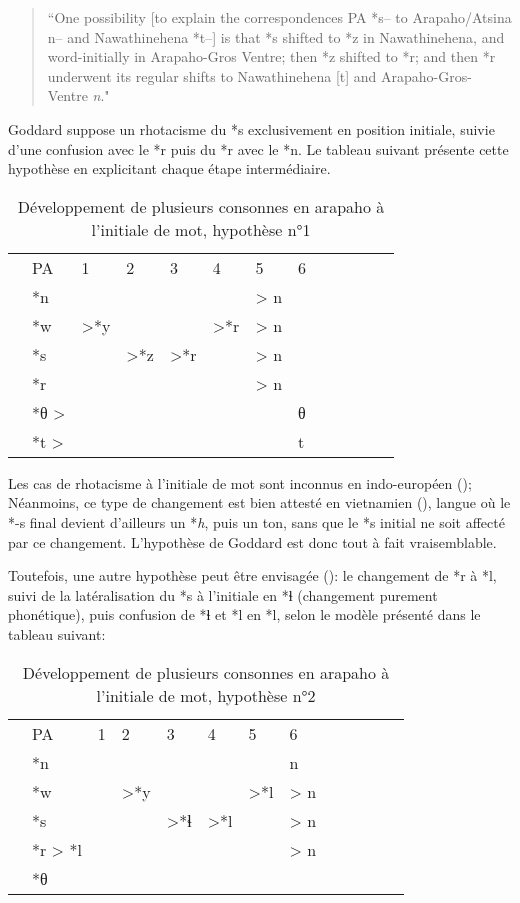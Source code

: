 \documentclass[twoside,a4paper,11pt]{article}
\newcommand{\ipa}[1]{{\phon\textit{#1}}}
\newcommand{\grise}[1]{\cellcolor{lightgray}\textbf{#1}}
\newcommand{\Σ}{\greek{Σ}}
\begin{document}
\begin{quote}
``One possibility [to explain the correspondences PA *s-- to Arapaho/Atsina n-- and Nawathinehena *t--] is that *s shifted to *z in Nawathinehena, and word-initially in Arapaho-Gros Ventre; then *z shifted to *r; and then *r underwent its regular shifts to Nawathinehena [t] and Arapaho-Gros-Ventre \textit{n}."
\end{quote}  
 Goddard suppose un rhotacisme du *s exclusivement en position initiale, suivie d'une confusion avec le *r puis du *r avec le *n. Le tableau suivant présente cette hypothèse en explicitant chaque étape intermédiaire.
\begin{table}[H]
\caption{Développement de plusieurs consonnes en arapaho à l'initiale de mot, hypothèse n°1}  \centering
\begin{tabular}{lllllllllllll}
&PA & 1 & 2 & 3 & 4 & 5 & 6 & \\
&*n   &&&&& > n\\
&*w   & >*y  \grise{} & \grise{} & \grise{}  &>*r	  \grise{} &> n \grise{}\\
&*s  &  &>*z &>*r	 \grise{}& 	 \grise{} &> n \grise{}\\
&*r	   & 	&  & 	& 	  &> n \grise{}\\
&*θ >  & &&&&&θ \\
&*t > & &&&&&t \\
\end{tabular}
\end{table}
Les cas de rhotacisme à l'initiale de mot sont inconnus en indo-européen (\citealt[80-81]{kuemmel07wandel}); Néanmoins, ce type de changement est bien attesté en vietnamien (\citet{ferlus82spirantisation}), langue où le *-s final devient d'ailleurs un *\ipa{h}, puis un ton, sans que le *s initial ne soit affecté par ce changement. L'hypothèse de Goddard est donc tout à fait vraisemblable.


Toutefois, une autre hypothèse peut être envisagée (\citealt{jacques13arapaho}): le changement de *r à *l, suivi de la latéralisation du *s à l'initiale en *ɬ (changement purement phonétique), puis confusion de *ɬ et *l en *l, selon le modèle présenté dans le tableau suivant:
\begin{table}[H]
\caption{Développement de plusieurs consonnes en arapaho à l'initiale de mot, hypothèse n°2}   \centering
\begin{tabular}{lllllllllllll}
&PA & 1 & 2 & 3 & 4 & 5 & 6   \\
&*n  &&&&&& n\\
&*w   && >*y  \grise{}   & \grise{}& \grise{}   &>*l \grise{} &> n \grise{}\\
&*s  && &  >*ɬ  &>*l \grise{}&  \grise{} & > n \grise{}\\
&*r > *l	 &  &  &    &  &    &> n \grise{}\\
&*θ  &  \\
\end{tabular}
\end{table}
\end{document}
